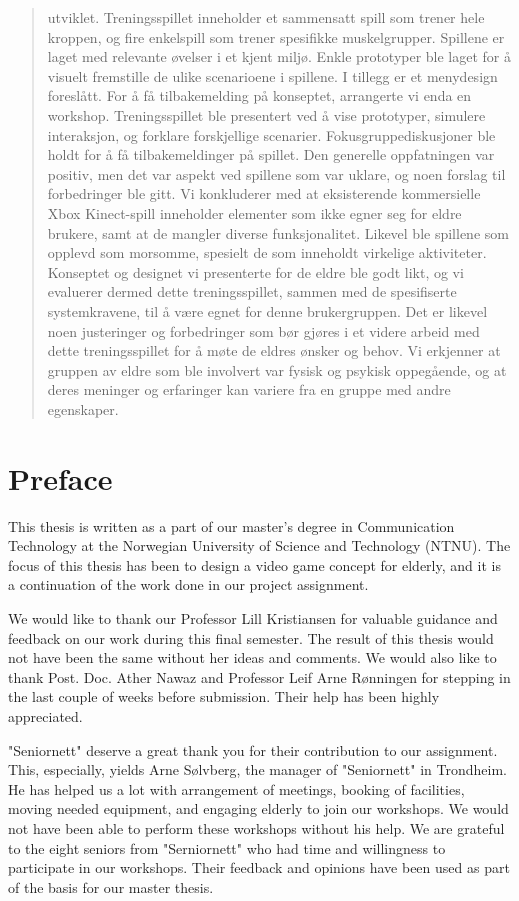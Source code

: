 \documentclass[b5paper,twoside,openright,11pt]{report}
\begin{document}
\begin{abstract}
utviklet. Treningsspillet inneholder et sammensatt spill som trener hele kroppen, og fire enkelspill som trener spesifikke muskelgrupper. Spillene er laget med relevante øvelser i et kjent miljø. Enkle prototyper ble laget for å visuelt fremstille de ulike scenarioene i spillene. I tillegg er et menydesign foreslått. For å få tilbakemelding på konseptet, arrangerte vi enda en workshop. Treningsspillet ble presentert ved å vise prototyper, simulere interaksjon, og forklare forskjellige scenarier. Fokusgruppediskusjoner ble holdt for å få tilbakemeldinger på spillet. Den generelle oppfatningen var positiv, men det var aspekt ved spillene som var uklare, og noen forslag til forbedringer ble gitt. Vi konkluderer med at eksisterende kommersielle Xbox Kinect-spill inneholder elementer som ikke egner seg for eldre brukere, samt at de mangler diverse funksjonalitet. Likevel ble spillene som opplevd som morsomme, spesielt de som inneholdt virkelige aktiviteter. Konseptet og designet vi presenterte for de eldre ble godt likt, og vi evaluerer dermed  dette treningsspillet, sammen med de spesifiserte systemkravene, til å være egnet for denne brukergruppen. Det er likevel noen justeringer og forbedringer som bør gjøres i et videre arbeid med dette treningsspillet for å møte de eldres ønsker og behov. Vi erkjenner at gruppen av eldre som ble involvert var fysisk og psykisk oppegående, og at deres meninger og erfaringer kan variere fra en gruppe med andre egenskaper. 
\end{abstract}
\cleardoublepage
\chapter*{Preface}
This thesis is written as a part of our master's degree in Communication Technology at the Norwegian University of Science and Technology (NTNU). The focus of this thesis has been to design a video game concept for elderly, and it is a continuation of the work done in our project assignment. 

We would like to thank our Professor Lill Kristiansen for valuable guidance and feedback on our work during this final semester. The result of this thesis would not have been the same without her ideas and comments. We would also like to thank Post. Doc. Ather Nawaz and Professor Leif Arne Rønningen for stepping in the last couple of weeks before submission. Their help has been highly appreciated.  

"Seniornett" deserve a great thank you for their contribution to our assignment. This, especially, yields Arne Sølvberg, the manager of "Seniornett" in Trondheim. He has helped us a lot with arrangement of meetings, booking of facilities, moving needed equipment, and engaging elderly to join our workshops. We would not have been able to perform these workshops without his help. We are grateful to the eight seniors from "Serniornett" who had time and willingness to participate in our workshops. Their feedback and opinions have been used as part of the basis for our master thesis. 
\end{document}
